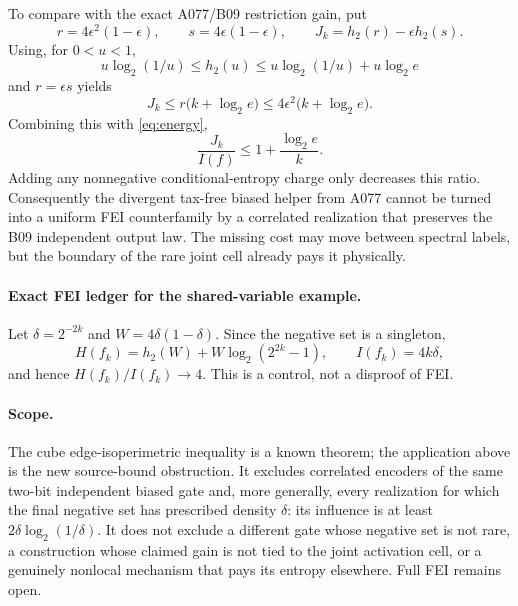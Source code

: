 To compare with the exact A077/B09 restriction gain, put
\[
 r=4\epsilon^2(1-\epsilon),\qquad
 s=4\epsilon(1-\epsilon),\qquad
 J_k=h_2(r)-\epsilon h_2(s).
\]
Using, for $0<u<1$,
\[
 u\log_2(1/u)\le h_2(u)
 \le u\log_2(1/u)+u\log_2 e
\]
and $r=\epsilon s$ yields
\[
 J_k\le r\bigl(k+\log_2e\bigr)
 \le4\epsilon^2\bigl(k+\log_2e\bigr).
\]
Combining this with \eqref{eq:energy},
\[
 \boxed{\frac{J_k}{I(f)}\le1+\frac{\log_2e}{k}.}
\]
Adding any nonnegative conditional-entropy charge only decreases this ratio.
Consequently the divergent tax-free biased helper from A077 cannot be turned
into a uniform FEI counterfamily by a correlated realization that preserves
the B09 independent output law.  The missing cost may move between spectral
labels, but the boundary of the rare joint cell already pays it physically.

\paragraph{Exact FEI ledger for the shared-variable example.}
Let $\delta=2^{-2k}$ and $W=4\delta(1-\delta)$.  Since the negative set is a
singleton,
\[
 H(f_k)=h_2(W)+W\log_2(2^{2k}-1),\qquad
 I(f_k)=4k\delta,
\]
and hence $H(f_k)/I(f_k)\to4$.  This is a control, not a disproof of FEI.

\paragraph{Scope.}
The cube edge-isoperimetric inequality is a known theorem; the application
above is the new source-bound obstruction.  It excludes correlated encoders
of the same two-bit independent biased gate and, more generally, every
realization for which the final negative set has prescribed density
$\delta$: its influence is at least $2\delta\log_2(1/\delta)$.  It does not
exclude a different gate whose negative set is not rare, a construction
whose claimed gain is not tied to the joint activation cell, or a genuinely
nonlocal mechanism that pays its entropy elsewhere.  Full FEI remains open.
